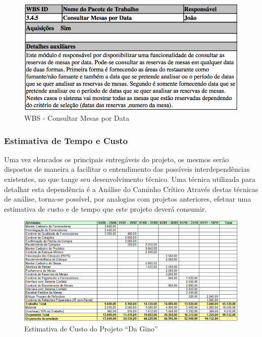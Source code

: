 \begin{figure}[H]
  \centering
  \includegraphics[width=1\textwidth]{softwareengineer/images/pmbok-wbs-345} 
  \caption{WBS - Consultar Mesas por Data}
  \label{fig:pmbok-wbs-345} 
\end{figure}

\subsubsection{Estimativa de Tempo e Custo}

Uma vez elencados os principais entregáveis do projeto, os mesmos serão dispostos de maneira a facilitar o entendimento das possíveis interdependências existentes, no que tange seu desenvolvimento técnico. Uma técnica utilizada para detalhar esta dependência é a Análise do Caminho Crítico
Através destas técnicas de análise, torna-se possível, por analogias com projetos anteriores, efetuar uma estimativa de custo e de tempo que este projeto deverá consumir.

\begin{figure}[H]
  \centering
  \includegraphics[width=1\textwidth]{softwareengineer/images/pmbok-dagino-cost-estimation} 
  \caption{Estimativa de Custo do Projeto “Da Gino”}
  \label{fig:pmbok-dagino-cost-estimation} 
\end{figure}


